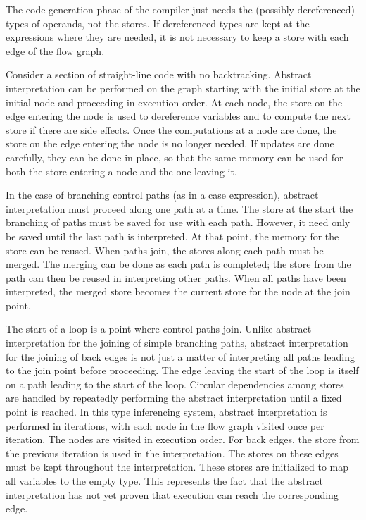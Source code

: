 The code generation phase of the compiler just needs the (possibly
dereferenced) types of operands, not the stores. If dereferenced types
are kept at the expressions where they are needed, it is not necessary
to keep a store with each edge of the flow graph.

Consider a section of straight-line code with no
backtracking. Abstract interpretation can be performed on the graph
starting with the initial store at the initial node and proceeding in
execution order. At each node, the store on the edge entering the node
is used to dereference variables and to compute the next store if
there are side effects. Once the computations at a node are done, the
store on the edge entering the node is no longer needed. If updates
are done carefully, they can be done in-place, so that the same memory
can be used for both the store entering a node and the one leaving it.

In the case of branching control paths (as in a case expression),
abstract interpretation must proceed along one path at a time. The
store at the start the branching of paths must be saved for use with
each path. However, it need only be saved until the last path is
interpreted. At that point, the memory for the store can be
reused. When paths join, the stores along each path must be
merged. The merging can be done as each path is completed; the store
from the path can then be reused in interpreting other paths. When all
paths have been interpreted, the merged store becomes the current
store for the node at the join point.

The start of a loop is a point where control paths join. Unlike
abstract interpretation for the joining of simple branching paths,
abstract interpretation for the joining of back edges is not just a
matter of interpreting all paths leading to the join point before
proceeding. The edge leaving the start of the loop is itself on a path
leading to the start of the loop. Circular dependencies among stores
are handled by repeatedly performing the abstract interpretation until
a fixed point is reached. In this type inferencing system, abstract
interpretation is performed in iterations, with each node in the flow
graph visited once per iteration. The nodes are visited in execution
order. For back edges, the store from the previous iteration is used
in the interpretation. The stores on these edges must be kept
throughout the interpretation. These stores are initialized to map all
variables to the empty type. This represents the fact that the
abstract interpretation has not yet proven that execution can reach
the corresponding edge.

